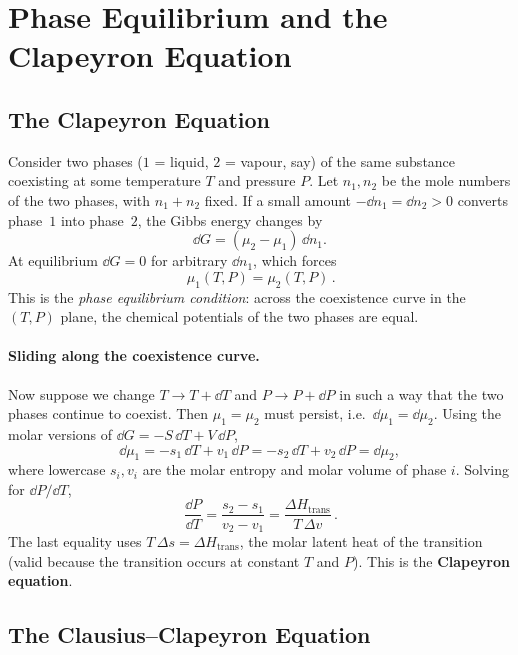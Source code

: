 \section{Phase Equilibrium and the Clapeyron Equation}

\subsection{The Clapeyron Equation}

Consider two phases ($1$ = liquid, $2$ = vapour, say) of the same substance coexisting at some temperature $T$ and pressure $P$. Let $n_1,n_2$ be the mole numbers of the two phases, with $n_1+n_2$ fixed. If a small amount $-\dd n_1 = \dd n_2 > 0$ converts phase~$1$ into phase~$2$, the Gibbs energy changes by
\[
    \dd G = (\mu_2 - \mu_1)\,\dd n_1.
\]
At equilibrium $\dd G = 0$ for arbitrary $\dd n_1$, which forces
\[
    \boxed{\,\mu_1(T,P) = \mu_2(T,P)\,}.
\]
This is the \emph{phase equilibrium condition}: across the coexistence curve in the $(T,P)$ plane, the chemical potentials of the two phases are equal.

\paragraph{Sliding along the coexistence curve.}
Now suppose we change $T\to T+\dd T$ and $P\to P+\dd P$ in such a way that the two phases continue to coexist. Then $\mu_1=\mu_2$ must persist, i.e.\ $\dd\mu_1=\dd\mu_2$. Using the molar versions of $\dd G = -S\,\dd T + V\,\dd P$,
\[
    \dd\mu_1 = -s_1\,\dd T + v_1\,\dd P
    = -s_2\,\dd T + v_2\,\dd P
    = \dd\mu_2,
\]
where lowercase $s_i, v_i$ are the molar entropy and molar volume of phase $i$. Solving for $\dd P/\dd T$,
\[
    \boxed{\,\frac{\dd P}{\dd T} = \frac{s_2 - s_1}{v_2 - v_1} = \frac{\Delta H_{\text{trans}}}{T\,\Delta v}\,}.
\]
The last equality uses $T\,\Delta s = \Delta H_{\text{trans}}$, the molar latent heat of the transition (valid because the transition occurs at constant $T$ and $P$). This is the \textbf{Clapeyron equation}.

\subsection{The Clausius--Clapeyron Equation}

